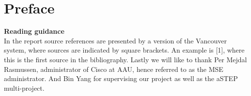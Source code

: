 \chapter*{Preface}

\textbf{Reading guidance}\\


In the report source references are presented by a version of the Vancouver system, where sources are indicated by square brackets. An example is [1], where this is the first source in the bibliography.
Lastly we will like to thank Per Mejdal Rasmussen, administrator of Cisco at AAU, hence referred to as the MSE administrator. And Bin Yang for supervising our project as well as the aSTEP multi-project. 

\begin{multicols}{2}
\signature{Oliver B. Købsted}
\signature{Anders L. Matthiassen}
\signature{Jacob Nielsen}
\signature{Simon A. Pedersen}
\end{multicols}